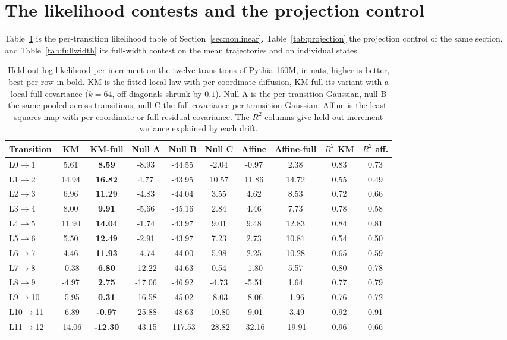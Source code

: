 \documentclass[mlmain]{jmlr}
\begin{document}


\clearpage
\section{The likelihood contests and the projection control}
\label{app:likelihood}
Table~\ref{tab:sde} is the per-transition likelihood table of
Section~\ref{sec:nonlinear}, Table~\ref{tab:projection} the projection
control of the same section, and Table~\ref{tab:fullwidth} its full-width
contest on the mean trajectories and on individual states.





\begin{table}[htbp]
\centering
\caption{Held-out log-likelihood per increment on the twelve transitions
of Pythia-160M, in nats, higher is better, best per row in bold. KM is
the fitted local law with per-coordinate diffusion, KM-full its variant
with a local full covariance ($k = 64$, off-diagonals shrunk by $0.1$).
Null A is the per-transition Gaussian, null B the same pooled across
transitions, null C the full-covariance per-transition Gaussian. Affine
is the least-squares map with per-coordinate or
full residual covariance. The $R^2$ columns give held-out increment
variance explained by each drift.}
\label{tab:sde}
\scriptsize
\setlength{\tabcolsep}{3.2pt}
\begin{tabular}{lccccccccc}
\toprule
Transition & KM & KM-full & Null A & Null B & Null C & Affine &
Affine-full & $R^2$ KM & $R^2$ aff. \\
\midrule
L0$\to$1 & 5.61 & \textbf{8.59} & -8.93 & -44.55 & -2.04 & -0.97 & 2.38 & 0.83 & 0.73 \\
L1$\to$2 & 14.94 & \textbf{16.82} & 4.77 & -43.95 & 10.57 & 11.86 & 14.72 & 0.55 & 0.49 \\
L2$\to$3 & 6.96 & \textbf{11.29} & -4.83 & -44.04 & 3.55 & 4.62 & 8.53 & 0.72 & 0.66 \\
L3$\to$4 & 8.00 & \textbf{9.91} & -5.66 & -45.16 & 2.84 & 4.46 & 7.73 & 0.78 & 0.58 \\
L4$\to$5 & 11.90 & \textbf{14.04} & -1.74 & -43.97 & 9.01 & 9.48 & 12.83 & 0.84 & 0.81 \\
L5$\to$6 & 5.50 & \textbf{12.49} & -2.91 & -43.97 & 7.23 & 2.73 & 10.81 & 0.54 & 0.50 \\
L6$\to$7 & 4.46 & \textbf{11.93} & -4.74 & -44.00 & 5.98 & 2.25 & 10.28 & 0.65 & 0.59 \\
L7$\to$8 & -0.38 & \textbf{6.80} & -12.22 & -44.63 & 0.54 & -1.80 & 5.57 & 0.80 & 0.78 \\
L8$\to$9 & -4.97 & \textbf{2.75} & -17.06 & -46.92 & -4.73 & -5.51 & 1.64 & 0.77 & 0.79 \\
L9$\to$10 & -5.95 & \textbf{0.31} & -16.58 & -45.02 & -8.03 & -8.06 & -1.96 & 0.76 & 0.72 \\
L10$\to$11 & -6.89 & \textbf{-0.97} & -25.88 & -48.63 & -10.80 & -9.01 & -3.49 & 0.92 & 0.91 \\
L11$\to$12 & -14.06 & \textbf{-12.30} & -43.15 & -117.53 & -28.82 & -32.16 & -19.91 & 0.96 & 0.66 \\
\bottomrule
\end{tabular}
\end{table}
\end{document}
